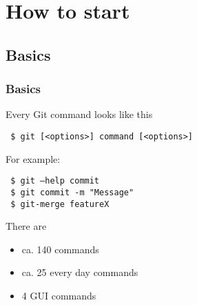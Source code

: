 \documentclass{beamer}
\begin{document}
\begin{frame}
\begin{minipage}[t]{0.48\linewidth}
{    }
  \end{minipage} 
\end{frame}


\section{How to start}
\subsection{Basics}
\begin{frame}
  \frametitle{Basics}
  Every Git command looks like this\medskip
  
  {\tt\ \$ git [<options>] command [<options>]}\medskip
  
  \pause
  For example:\medskip
  
  {\tt\ \$ git --help commit}\\
  {\tt\ \$ git commit -m "Message"}\\
  {\tt\ \$ git-merge featureX}\medskip
  
  \pause
  There are
  \begin{itemize}
    \item ca. 140 commands
    \item ca. 25 every day commands
    \item 4 GUI commands
  \end{itemize}   
\end{frame}
\end{document}
